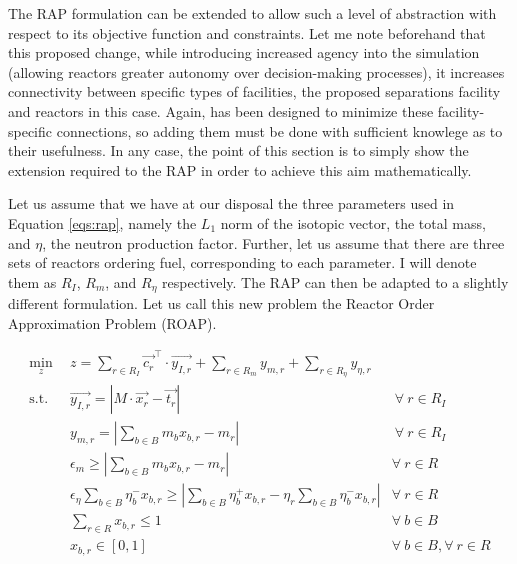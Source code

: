 The RAP formulation can be extended to allow such a level of abstraction with
respect to its objective function and constraints. Let me note beforehand that
this proposed change, while introducing increased agency into the simulation
(allowing reactors greater autonomy over decision-making processes), it
increases connectivity between specific types of facilities, the proposed
separations facility and reactors in this case. Again, \Cyclus has been designed
to minimize these facility-specific connections, so adding them must be done
with sufficient knowlege as to their usefulness. In any case, the point of this
section is to simply show the extension required to the RAP in order to achieve
this aim mathematically.

Let us assume that we have at our disposal the three parameters used in Equation
\ref{eqs:rap}, namely the $L_1$ norm of the isotopic vector, the total mass, and
$\eta$, the neutron production factor. Further, let us assume that there are
three sets of reactors ordering fuel, corresponding to each parameter. I will
denote them as $R_I$, $R_m$, and $R_\eta$ respectively. The RAP can then be
adapted to a slightly different formulation. Let us call this new problem the
Reactor Order Approximation Problem (ROAP).

\begin{subequations}\label{eqs:roap}
  \begin{align}
    \min_{z} \:\: & 
    z = \sum_{r \in R_I} \vec{c_{r}}^{\top} \cdot \vec{y_{I,r}}
    + \sum_{r \in R_m} y_{m,r} + \sum_{r \in R_\eta} y_{\eta,r}
    & \label{eqs:roap_obj} \\
    \text{s.t.} \:\: &
    \vec{y_{I,r}} = \left| M \cdot \vec{x_{r}}  - \vec{t_{r}} \right|
    &
    \: \forall \: r \in R_I \label{eqs:roap_iso_y} \\
    &
    y_{m,r} = \left| \sum_{b \in B} m_{b} x_{b,r} - m_{r} \right| 
    &
    \: \forall \: r \in R_I \label{eqs:roap_mass_y} \\
    &
    \epsilon_{m} \geq \left| \sum_{b \in B} m_{b} x_{b,r} - m_{r} \right|
    & 
    \forall \: r \in R \label{eqs:roap_mass} \\
    &
    \epsilon_{\eta} \sum_{b \in B} \eta_{b}^{-} x_{b,r} \geq 
    \left| \sum_{b \in B} \eta_{b}^{+} x_{b,r} - 
           \eta_{r} \sum_{b \in B} \eta_{b}^{-} x_{b,r} \right|
    & 
    \forall \: r \in R \label{eqs:roap_eta} \\
    &
    \sum_{r \in R} x_{b,r} \leq 1
    & 
    \forall \: b \in B \label{eqs:roap_conserv} \\
    &
    x_{b,r} \in \left[ 0, 1 \right]
    & 
    \forall \: b \in B, \forall \: r \in R  \label{eqs:roap_x}
  \end{align}
\end{subequations}

